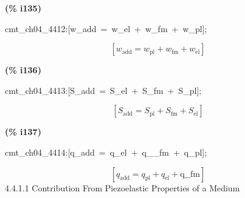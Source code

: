 \documentclass[fleqn]{article}
\begin{document}
\noindent
\begin{minipage}[t]{4.000000em}\color{red}\bfseries
(\% i135)	
\end{minipage}
\begin{minipage}[t]{\textwidth}\color{blue}
cmt\_ch04\_4412:[w\_add\ =\ w\_el\ +\ w\_fm\ +\ w\_pl];
\end{minipage}
\[\displaystyle \tag{\% o135} 
\left[ {w_{\ensuremath{\mathrm{add}}}}={w_{\ensuremath{\mathrm{pl}}}}+{w_{\ensuremath{\mathrm{fm}}}}+{w_{\ensuremath{\mathrm{el}}}}\right] \mbox{}
\]


\noindent
\begin{minipage}[t]{4.000000em}\color{red}\bfseries
(\% i136)	
\end{minipage}
\begin{minipage}[t]{\textwidth}\color{blue}
cmt\_ch04\_4413:[S\_add\ =\ S\_el\ +\ S\_fm\ +\ S\_pl];
\end{minipage}
\[\displaystyle \tag{\% o136} 
\left[ {S_{\ensuremath{\mathrm{add}}}}={S_{\ensuremath{\mathrm{pl}}}}+{S_{\ensuremath{\mathrm{fm}}}}+{S_{\ensuremath{\mathrm{el}}}}\right] \mbox{}
\]


\noindent
\begin{minipage}[t]{4.000000em}\color{red}\bfseries
(\% i137)	
\end{minipage}
\begin{minipage}[t]{\textwidth}\color{blue}
cmt\_ch04\_4414:[q\_add\ =\ q\_el\ +\ q\_\_fm\ +\ q\_pl];
\end{minipage}
\[\displaystyle \tag{\% o137} 
\left[ {q_{\ensuremath{\mathrm{add}}}}={q_{\ensuremath{\mathrm{pl}}}}+{q_{\ensuremath{\mathrm{el}}}}+\ensuremath{\mathrm{q\_ \_ fm}}\right] \mbox{}
\]
4.4.1.1         Contribution From Piezoelastic Properties of a Medium
\end{document}
